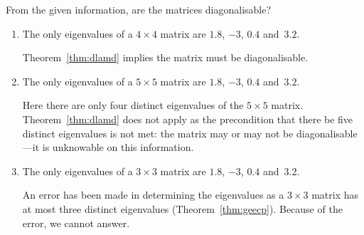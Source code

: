 \begin{example} \label{eg:}
From the given information, are the matrices diagonalisable?
\begin{enumerate}
\item The only eigenvalues of a \(4\times 4\) matrix are \(1.8\), \(-3\), \(0.4\) and~\(3.2\).
\begin{solution} 
Theorem~\ref{thm:dlamd} implies the matrix must be diagonalisable.
\end{solution}

\item The only eigenvalues of a \(5\times 5\) matrix are \(1.8\), \(-3\), \(0.4\) and~\(3.2\).
\begin{solution} 
Here there are only four distinct eigenvalues of the \(5\times5\) matrix.
Theorem~\ref{thm:dlamd} does not apply as the precondition that there be five distinct eigenvalues is not met: the matrix may or may not be diagonalisable---it is unknowable on this information.
\end{solution}

\item The only eigenvalues of a \(3\times 3\) matrix are \(1.8\), \(-3\), \(0.4\) and~\(3.2\).
\begin{solution} 
An error has been made in determining the eigenvalues as a \(3\times3\) matrix has at most three distinct eigenvalues (Theorem~\ref{thm:geecp}).
Because of the error, we cannot answer.
\end{solution}

\end{enumerate}
\end{example}



